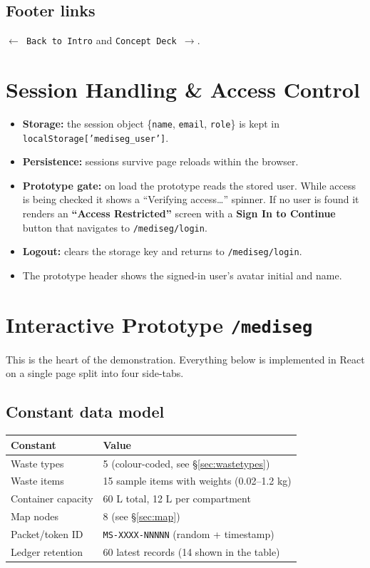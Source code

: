\documentclass[11pt, a4paper]{article}
\begin{document}
\subsection{Footer links}
\texttt{$\leftarrow$ Back to Intro} and \texttt{Concept Deck $\rightarrow$}.

\section{Session Handling \& Access Control}

\begin{itemize}[leftmargin=1.6em, itemsep=2pt]
  \item \textbf{Storage:} the session object \{\texttt{name}, \texttt{email},
        \texttt{role}\} is kept in \texttt{localStorage['mediseg\_user']}.
  \item \textbf{Persistence:} sessions survive page reloads within the browser.
  \item \textbf{Prototype gate:} on load the prototype reads the stored user.
        While access is being checked it shows a ``Verifying access\ldots''
        spinner. If no user is found it renders an
        \textbf{``Access Restricted''} screen with a \textbf{Sign In to
        Continue} button that navigates to \texttt{/mediseg/login}.
  \item \textbf{Logout:} clears the storage key and returns to
        \texttt{/mediseg/login}.
  \item The prototype header shows the signed-in user's avatar initial and name.
\end{itemize}

\section{Interactive Prototype \texttt{/mediseg}}

This is the heart of the demonstration. Everything below is implemented in
React on a single page split into four side-tabs.

\subsection{Constant data model}
\begin{tabularx}{\textwidth}{lX}
  \toprule
  \textbf{Constant} & \textbf{Value}\\
  \midrule
  Waste types & 5 (colour-coded, see \S\ref{sec:wastetypes})\\
  Waste items & 15 sample items with weights (0.02--1.2 kg)\\
  Container capacity & 60 L total, 12 L per compartment\\
  Map nodes & 8 (see \S\ref{sec:map})\\
  Packet/token ID & \texttt{MS-}\texttt{XXXX-}\texttt{NNNNN} (random + timestamp)\\
  Ledger retention & 60 latest records (14 shown in the table)\\
  \bottomrule
\end{tabularx}
\end{document}
